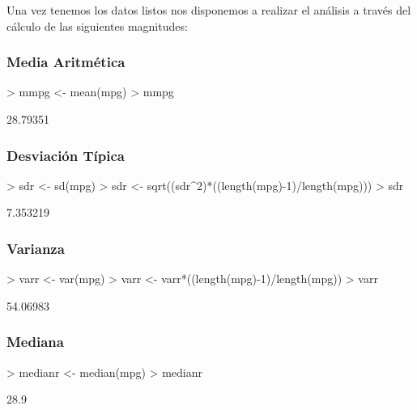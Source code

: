 \documentclass [a4paper] {article}
\begin{document}
Una vez tenemos los datos listos nos disponemos a realizar el análisis a través del cálculo de las siguientes magnitudes:
\subsubsection{Media Aritmética}
\begin{Schunk}
\begin{Sinput}
> mmpg <- mean(mpg)
> mmpg
\end{Sinput}
\begin{Soutput}
[1] 28.79351
\end{Soutput}
\end{Schunk}

\subsubsection{Desviación Típica}
\begin{Schunk}
\begin{Sinput}
> sdr <- sd(mpg)
> sdr <- sqrt((sdr^2)*((length(mpg)-1)/length(mpg)))
> sdr
\end{Sinput}
\begin{Soutput}
[1] 7.353219
\end{Soutput}
\end{Schunk}

\subsubsection{Varianza}
\begin{Schunk}
\begin{Sinput}
> varr <- var(mpg)
> varr <- varr*((length(mpg)-1)/length(mpg))
> varr
\end{Sinput}
\begin{Soutput}
[1] 54.06983
\end{Soutput}
\end{Schunk}

\subsubsection{Mediana}
\begin{Schunk}
\begin{Sinput}
> medianr <- median(mpg)
> medianr
\end{Sinput}
\begin{Soutput}
[1] 28.9
\end{Soutput}
\end{Schunk}
\end{document}

